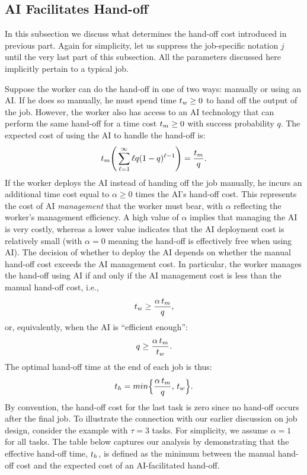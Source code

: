 \documentclass{article}
\theoremstyle{plain}
\theoremstyle{plain}
\begin{document}
\subsection{AI Facilitates Hand-off}
In this subsection we discuss what determines the hand-off cost introduced in previous part.
Again for simplicity, let us suppress the job-specific notation $j$ until the very last part of this subsection.
All the parameters discussed here implicitly pertain to a typical job.

Suppose the worker can do the hand-off in one of two ways: manually or using an AI.
If he does so manually, he must spend time $t_{w} \geq 0$ to hand off the output of the job.
However, the worker also has access to an AI technology that can perform the same hand-off for a time cost $t_{m} \geq 0$ with success probability $q$.
The expected cost of using the AI to handle the hand-off is:
\[
t_{m} \Bigg( \sum_{\ell=1}^{\infty} \ell q (1 - q)^{\ell - 1} \Bigg) = \frac{t_{m}}{q}.
\]
If the worker deploys the AI instead of handing off the job manually, he incurs an additional time cost equal to $\alpha \geq 0$ times the AI’s hand-off cost.
This represents the cost of AI \emph{management} that the worker must bear, with $\alpha$ reflecting the worker's management efficiency.
A high value of $\alpha$ implies that managing the AI is very costly, whereas a lower value indicates that the AI deployment cost is relatively small (with $\alpha = 0$ meaning the hand-off is effectively free when using AI).
The decision of whether to deploy the AI depends on whether the manual hand-off cost exceeds the AI management cost.
In particular, the worker manages the hand-off using AI if and only if the AI management cost is less than the manual hand-off cost, i.e.,
\[
t_{w} \geq \frac{\alpha \, t_{m}}{q},
\]
or, equivalently, when the AI is “efficient enough”:
\[
q \geq \frac{\alpha \, t_{m}}{t_{w}}.
\]
The optimal hand-off time at the end of each job is thus:
\[
t_{h} = min \Bigl\{\frac{\alpha \, t_{m}}{q},\, t_{w}\Bigr\}.
\]
By convention, the hand-off cost for the last task is zero since no hand-off occurs after the final job.
To illustrate the connection with our earlier discussion on job design, consider the example with $\tau=3$ tasks.
For simplicity, we assume $\alpha = 1$ for all tasks.  
The table below captures our analysis by demonstrating that the effective hand-off time, $t_{h}$, is defined as the minimum between the manual hand-off cost and the expected cost of an AI-facilitated hand-off.
\end{document}
